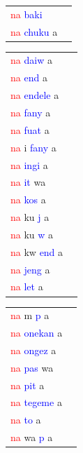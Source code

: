 \documentclass[output=paper,colorlinks,citecolor=brown,
]{langscibook}
\begin{document}
\begin{table}
\begin{minipage}[t]{.24\textwidth}
\begin{tabular}{ll}
\textcolor{red}{na} \textcolor{blue}{baki} \\ 
\textcolor{red}{na} \textcolor{blue}{chuku} a \\ 
\end{tabular}
\end{minipage}
\begin{minipage}[t]{.24\textwidth}
\begin{tabular}{ll}
\textcolor{red}{na} \textcolor{blue}{daiw} a \\ 
\textcolor{red}{na} \textcolor{blue}{end} a \\ 
\textcolor{red}{na} \textcolor{blue}{endele} a \\ 
\textcolor{red}{na} \textcolor{blue}{fany} a \\ 
\textcolor{red}{na} \textcolor{blue}{fuat} a \\ 
\textcolor{red}{na} i \textcolor{blue}{fany} a \\ 
\textcolor{red}{na} \textcolor{blue}{ingi} a \\ 
\textcolor{red}{na} \textcolor{blue}{it} wa \\  
\textcolor{red}{na} \textcolor{blue}{kos} a \\ 
\textcolor{red}{na} ku \textcolor{blue}{j} a \\ 
\textcolor{red}{na} ku \textcolor{blue}{w} a \\  
\textcolor{red}{na} kw \textcolor{blue}{end} a \\ 
\textcolor{red}{na} \textcolor{blue}{jeng} a \\ 
\textcolor{red}{na} \textcolor{blue}{let} a \\ 
\end{tabular}
\end{minipage}
\begin{minipage}[t]{.24\textwidth}
\begin{tabular}{ll}
\textcolor{red}{na} m \textcolor{blue}{p} a \\ 
\textcolor{red}{na} \textcolor{blue}{onekan} a \\ 
\textcolor{red}{na} \textcolor{blue}{ongez} a \\ 
\textcolor{red}{na} \textcolor{blue}{pas} wa \\ 
\textcolor{red}{na} \textcolor{blue}{pit} a \\ 
\textcolor{red}{na} \textcolor{blue}{tegeme} a \\ 
\textcolor{red}{na} \textcolor{blue}{to} a \\ 
\textcolor{red}{na} wa \textcolor{blue}{p} a \\ 

\end{tabular}
\end{minipage}
\end{table}
\end{document}
